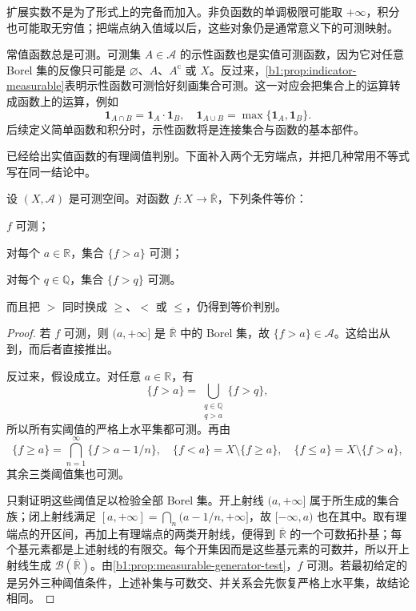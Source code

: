 扩展实数不是为了形式上的完备而加入。非负函数的单调极限可能取 \(+\infty\)，积分也可能取无穷值；把端点纳入值域以后，这些对象仍是通常意义下的可测映射。

\ProseParagraphBreak

常值函数总是可测。可测集 \(A\in\mathcal A\) 的示性函数也是实值可测函数，因为它对任意 Borel 集的反像只可能是 \(\varnothing\)、\(A\)、\(A^{\mathrm c}\) 或 \(X\)。反过来，\cref{b1:prop:indicator-measurable}表明示性函数可测恰好刻画集合可测。这一对应会把集合上的运算转成函数上的运算，例如
\[
\mathbf 1_{A\cap B}=\mathbf 1_A\cdot\mathbf 1_B,
\quad
\mathbf 1_{A\cup B}=\max\{\mathbf 1_A,\mathbf 1_B\}.
\]
后续定义简单函数和积分时，示性函数将是连接集合与函数的基本部件。

\ProseParagraphBreak

已经给出实值函数的有理阈值判别。下面补入两个无穷端点，并把几种常用不等式写在同一结论中。

\begin{proposition}
\label{b1:prop:extended-real-thresholds}
设 \((X,\mathcal A)\) 是可测空间。对函数 \(f:X\rightarrow\overline{\mathbb R}\)，下列条件等价：
\begin{equivalences}
  \item \label{b1:item:0401-threshold-1}\(f\) 可测；
  \item \label{b1:item:0401-threshold-2}对每个 \(a\in\mathbb R\)，集合 \(\{f>a\}\) 可测；
  \item \label{b1:item:0401-threshold-3}对每个 \(q\in\mathbb Q\)，集合 \(\{f>q\}\) 可测。
\end{equivalences}
而且把 \(>\) 同时换成 \(\geq\)、\(<\) 或 \(\leq\)，仍得到等价判别。
\end{proposition}
\begin{proof}
若 \(f\) 可测，则 \((a,+\infty]\) 是 \(\overline{\mathbb R}\) 中的 Borel 集，故 \(\{f>a\}\in\mathcal A\)。这给出从到，而后者直接推出。

反过来，假设成立。对任意 \(a\in\mathbb R\)，有
\[
\{f>a\}
=\bigcup_{\substack{q\in\mathbb Q\\q>a}}\{f>q\},
\]
所以所有实阈值的严格上水平集都可测。再由
\[
\{f\geq a\}=\bigcap_{n=1}^{\infty}\{f>a-1/n\},
\quad
\{f<a\}=X\setminus\{f\geq a\},
\quad
\{f\leq a\}=X\setminus\{f>a\},
\]
其余三类阈值集也可测。

只剩证明这些阈值足以检验全部 Borel 集。开上射线 \((a,+\infty]\) 属于所生成的集合族；闭上射线满足
\(
[a,+\infty]=\bigcap_n(a-1/n,+\infty]
\)，故 \([-\infty,a)\) 也在其中。取有理端点的开区间，再加上有理端点的两类开射线，便得到 \(\overline{\mathbb R}\) 的一个可数拓扑基；每个基元素都是上述射线的有限交。每个开集因而是这些基元素的可数并，所以开上射线生成 \(\mathcal B(\overline{\mathbb R})\)。由\cref{b1:prop:measurable-generator-test}，\(f\) 可测。若最初给定的是另外三种阈值条件，上述补集与可数交、并关系会先恢复严格上水平集，故结论相同。
\end{proof}

